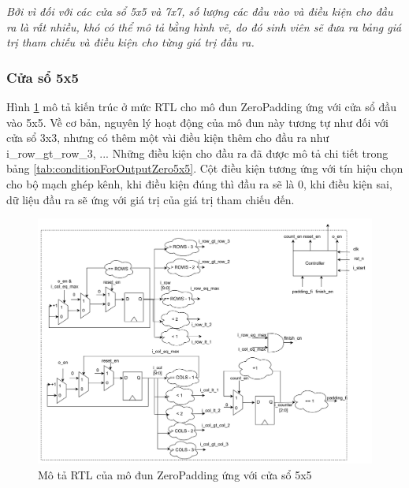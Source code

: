 \textit{
Bởi vì đối với các cửa sổ 5x5 và 7x7, số lượng các đầu vào và điều kiện cho đầu ra là rất nhiều, khó có thể mô tả bằng hình vẽ, do đó sinh viên sẽ đưa ra bảng giá trị tham chiếu và điều kiện cho từng giá trị đầu ra. }

\subsubsection{Cửa sổ 5x5}
Hình \ref{fig:zero5x5Architecture1} mô tả kiến trúc ở mức RTL cho mô đun ZeroPadding ứng với cửa sổ đầu vào 5x5. Về cơ bản, nguyên lý hoạt động của mô đun này tương tự như đối với cửa sổ 3x3, nhưng có thêm một vài điều kiện thêm cho đầu ra như i\_row\_gt\_row\_3, ... Những điều kiện cho đầu ra đã được mô tả chi tiết trong bảng \ref{tab:conditionForOutputZero5x5}. Cột điều kiện tương ứng với tín hiệu chọn cho bộ mạch ghép kênh, khi điều kiện đúng thì đầu ra sẽ là 0, khi điều kiện sai, dữ liệu đầu ra sẽ ứng với giá trị của giá trị tham chiếu đến.
\begin{figure}[!ht]
    \centering
    \includegraphics[width=0.9\linewidth]{figures/zero5x5Architecture1.png}
    \caption{Mô tả RTL của mô đun ZeroPadding ứng với cửa sổ 5x5}
    \label{fig:zero5x5Architecture1}
\end{figure}


